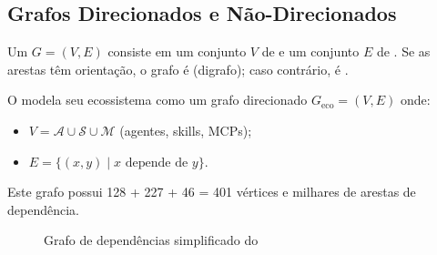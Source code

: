 \subsection{Grafos Direcionados e Não-Direcionados}
\begin{definicao}[Grafo]
Um  $G = (V, E)$ consiste em um conjunto $V$ de
 e um conjunto $E$ de . Se as
arestas têm orientação, o grafo é  (digrafo); caso
contrário, é .
\end{definicao}
\begin{exemplo}
O \opencodeeco{} modela seu ecossistema como um grafo direcionado
$G_{\text{eco}} = (V, E)$ onde:
\begin{itemize}
\item $V = \mathcal{A} \cup \mathcal{S} \cup \mathcal{M}$ (agentes,
skills, MCPs);
\item $E = \{(x, y) \mid x \text{ depende de } y\}$.
\end{itemize}
Este grafo possui 128 + 227 + 46 = 401 vértices e milhares de arestas
de dependência.
\end{exemplo}
\begin{figure}[htb]
\centrifugo
\caption{Grafo de dependências simplificado do \opencodeeco{}}
\label{fig:grafo-dependencias}
\end{figure}
